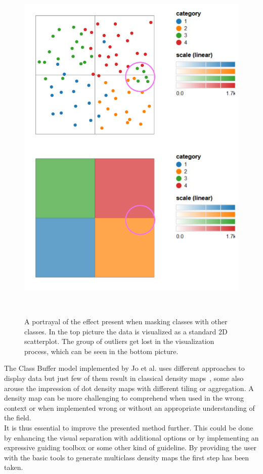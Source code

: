 \begin{figure}
	\centering
	\includegraphics[width=0.85\columnwidth]{./figures/outliers}
	\caption[outliers]{A portrayal of the effect present when masking classes with other classes. In the top picture the data is visualized as a standard 2D scatterplot. The group of outliers get lost in the visualization process, which can be seen in the bottom picture.}~\label{fig:outliers}
\end{figure}

The Class Buffer model implemented by Jo et al. uses different approaches to display data but just few of them result in classical density maps~\cite{jo2019declarative}, some also arouse the impression of dot density maps with different tiling or aggregation.
A density map can be more challenging to comprehend when used in the wrong context or when implemented wrong or without an appropriate understanding of the field.\\It is thus essential to improve the presented method further. This could be done by enhancing the visual separation with additional options or by implementing an expressive guiding toolbox or some other kind of guideline. By providing the user with the basic tools to generate multiclass density maps the first step has been taken.


